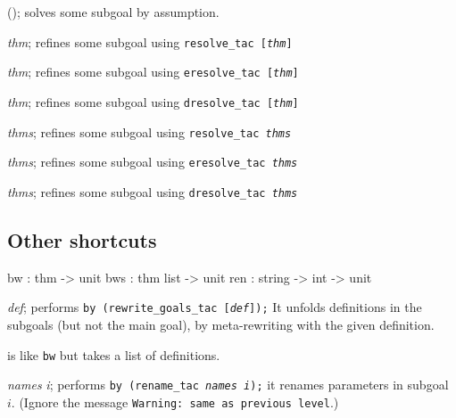 \begin{ttdescription}
\item[\ttindexbold{fa}();] 
solves some subgoal by assumption.

\item[\ttindexbold{fr} {\it thm};] 
refines some subgoal using \hbox{\tt resolve_tac [{\it thm}]}

\item[\ttindexbold{fe} {\it thm};] 
refines some subgoal using \hbox{\tt eresolve_tac [{\it thm}]}

\item[\ttindexbold{fd} {\it thm};] 
refines some subgoal using \hbox{\tt dresolve_tac [{\it thm}]}

\item[\ttindexbold{frs} {\it thms};] 
refines some subgoal using \hbox{\tt resolve_tac {\it thms}}

\item[\ttindexbold{fes} {\it thms};] 
refines some subgoal using \hbox{\tt eresolve_tac {\it thms}} 

\item[\ttindexbold{fds} {\it thms};] 
refines some subgoal using \hbox{\tt dresolve_tac {\it thms}} 
\end{ttdescription}

\subsection{Other shortcuts}
\begin{ttbox} 
bw  : thm -> unit
bws : thm list -> unit
ren : string -> int -> unit
\end{ttbox}
\begin{ttdescription}
\item[\ttindexbold{bw} {\it def};] 
performs \hbox{\tt by (rewrite_goals_tac [{\it def}]);}
It unfolds definitions in the subgoals (but not the main goal), by
meta-rewriting with the given definition.

\item[\ttindexbold{bws}] 
is like {\tt bw} but takes a list of definitions.

\item[\ttindexbold{ren} {\it names} {\it i};] 
performs \hbox{\tt by (rename_tac {\it names} {\it i});} it renames
parameters in subgoal~$i$.  (Ignore the message {\footnotesize\tt Warning:\
  same as previous level}.)
\end{ttdescription}


